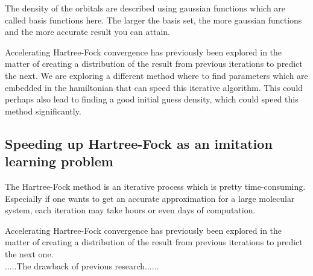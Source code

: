 \documentclass[twoside]{article}
\begin{document}

The density of the orbitals are described using gaussian functions which are called basis functions here. The larger the basis set, the more gaussian functions and the more accurate result you can attain.

Accelerating Hartree-Fock convergence has previously been explored in the matter of creating a distribution of the result from previous iterations to predict the next\cite{Pulay1980}. We are exploring a different method where to find parameters which are embedded in the hamiltonian that can speed this iterative algorithm. This could perhaps also lead to finding a good initial guess density, which could speed this method significantly. 




\subsection{Speeding up Hartree-Fock as an imitation learning problem}

The Hartree-Fock method is an iterative process which is pretty time-consuming. Especially if one wants to get an accurate approximation for a large molecular system, each iteration may take  hours or even days of computation. 

Accelerating Hartree-Fock convergence has previously been explored in the matter of creating a distribution of the result from previous iterations to predict the next one\cite{Pulay1980}.  \\
.....The drawback of previous research......




\end{document}
